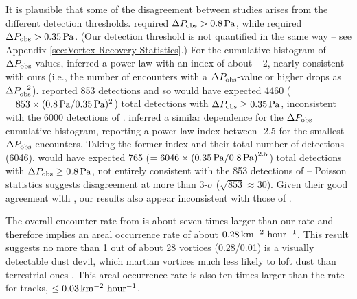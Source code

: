 \documentclass[linenumbers,trackchanges]{aastex63}
\begin{document}
It is plausible that some of the disagreement between studies arises from the different detection thresholds. \citet{2021Icar..35514119L} required $\Delta P_{\rm obs} > 0.8\,{\rm Pa}$, while \citet{2021JGRE..12606511S} required $\Delta P_{\rm obs} > 0.35\,{\rm Pa}$. (Our detection threshold is not quantified in the same way -- see Appendix \ref{sec:Vortex Recovery Statistics}.) For the cumulative histogram of $\Delta P_{\rm obs}$-values, \citet{2021Icar..35514119L} inferred a power-law with an index of about $-2$, nearly consistent with ours (i.e., the number of encounters with a $\Delta P_{\rm obs}$-value or higher drops as $\Delta P_{\rm obs}^{-2}$). \citet{2021Icar..35514119L} reported 853 detections and so would have expected 4460 ($= 853 \times (0.8\,{\rm Pa}/0.35\,{\rm Pa})^2$) total detections with $\Delta P_{\rm obs} \geq 0.35\,{\rm Pa}$, inconsistent with the 6000 detections of \citet{2021JGRE..12606511S}. \citet{2021JGRE..12606511S} inferred a similar dependence for the $\Delta P_{\rm obs}$ cumulative histogram, reporting a power-law index between -2.5 for the smallest-$\Delta P_{\rm obs}$ encounters. Taking the former index and their total number of detections (6046), \citet{2021JGRE..12606511S} would have expected 765 ($= 6046 \times \left(0.35\,{\rm Pa}/0.8\,{\rm Pa} \right)^{2.5}$) total detections with $\Delta P_{\rm obs} \geq 0.8\,{\rm Pa}$, not entirely consistent with the 853 detections of \citet{2021Icar..35514119L} -- Poisson statistics suggests disagreement at more than 3-$\sigma$ ($\sqrt{853} \approx 30$). Given their good agreement with \citet{2021Icar..35514119L}, our results also appear inconsistent with those of \citet{2021JGRE..12606511S}.

The overall encounter rate from \citet{2021JGRE..12606511S} is about seven times larger than our rate and therefore implies an areal occurrence rate of about $0.28\,{\rm km^{-2}\ hour^{-1}}$. This result suggests no more than 1 out of about 28 vortices (0.28/0.01) is a visually detectable dust devil, which  martian vortices  much less likely to loft dust than terrestrial ones \citep{LORENZ20151}. This areal occurrence rate is also ten times larger than the rate for tracks, $\le 0.03\,{\rm km^{-2}\ hour^{-1}}$.
\end{document}
